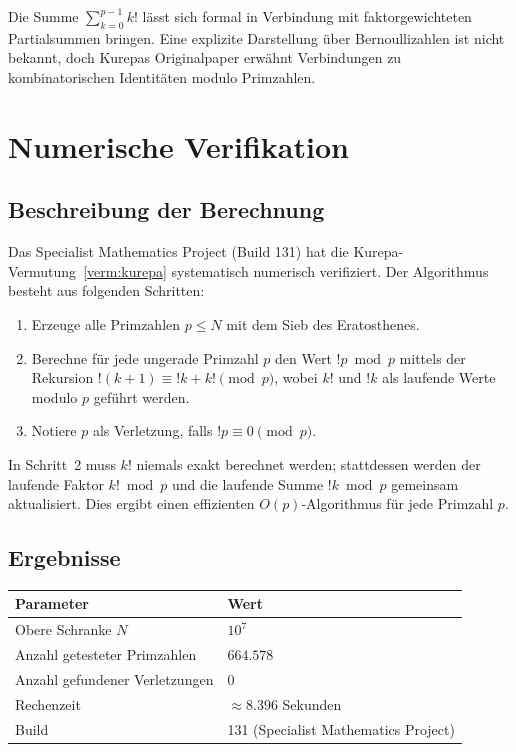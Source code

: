 \documentclass[12pt,a4paper]{amsart}
\theoremstyle{definition}
\begin{document}
Die Summe $\sum_{k=0}^{p-1} k!$ lässt sich formal in Verbindung mit
faktorgewichteten Partialsummen bringen.
Eine explizite Darstellung über Bernoullizahlen ist nicht bekannt, doch
Kurepas Originalpaper erwähnt Verbindungen zu kombinatorischen Identitäten
modulo Primzahlen.

\section{Numerische Verifikation}
\label{sec:verifikation}

\subsection{Beschreibung der Berechnung}

Das Specialist Mathematics Project (Build 131) hat die
Kurepa-Vermutung~\ref{verm:kurepa} systematisch numerisch verifiziert.
Der Algorithmus besteht aus folgenden Schritten:

\begin{enumerate}
\item Erzeuge alle Primzahlen $p \leq N$ mit dem Sieb des Eratosthenes.
\item Berechne für jede ungerade Primzahl $p$ den Wert $!p \bmod p$
      mittels der Rekursion
      $!(k+1) \equiv !k + k! \pmod p$,
      wobei $k!$ und $!k$ als laufende Werte modulo $p$ geführt werden.
\item Notiere $p$ als Verletzung, falls $!p \equiv 0 \pmod p$.
\end{enumerate}

In Schritt~2 muss $k!$ niemals exakt berechnet werden; stattdessen werden
der laufende Faktor $k! \bmod p$ und die laufende Summe $!k \bmod p$
gemeinsam aktualisiert.
Dies ergibt einen effizienten $O(p)$-Algorithmus für jede Primzahl $p$.

\subsection{Ergebnisse}

\begin{center}
\begin{tabular}{@{}ll@{}}
\toprule
Parameter & Wert \\
\midrule
Obere Schranke $N$ & $10^7$ \\
Anzahl getesteter Primzahlen & $664{.}578$ \\
Anzahl gefundener Verletzungen & $0$ \\
Rechenzeit & $\approx 8{.}396$ Sekunden \\
Build & 131 (Specialist Mathematics Project) \\
\bottomrule
\end{tabular}
\end{center}
\end{document}
